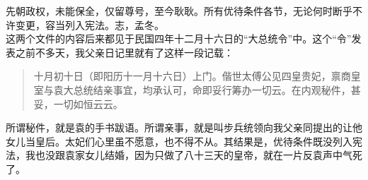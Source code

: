 先朝政权，未能保全，仅留尊号，至今耿耿。所有优待条件各节，无论何时断乎不许变更，容当列入宪法。志，孟冬。\\

这两个文件的内容后来都见于民国四年十二月十六日的“大总统令”中。这个“令”发表之前不多天，我父亲日记里就有了这样一段记载：\\

\begin{quote}
	十月初十日（即阳历十一月十六日）上门。偕世太傅公见四皇贵妃，禀商皇室与袁大总统结亲事宜，均承认可，命即妥行筹办一切云。在内观秘件，甚妥，一切如恒云云。\\
\end{quote}

所谓秘件，就是袁的手书跋语。所谓亲事，就是叫步兵统领向我父亲同提出的让他女儿当皇后。太妃们心里虽不愿意，也不得不从。其结果是，优待条件既没列入宪法，我也没跟袁家女儿结婚，因为只做了八十三天的皇帝，就在一片反袁声中气死了。

